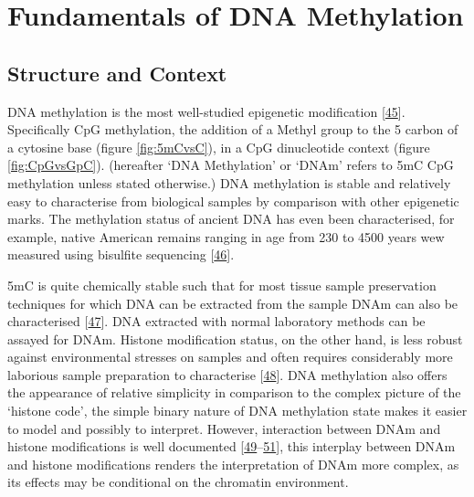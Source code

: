\documentclass[
]{book}
\begin{document}
\hypertarget{fundamentals-of-dna-methylation}{%
\section{Fundamentals of DNA Methylation}\label{fundamentals-of-dna-methylation}}

\hypertarget{structure-and-context}{%
\subsection{Structure and Context}\label{structure-and-context}}

DNA methylation is the most well-studied epigenetic modification {[}\protect\hyperlink{ref-Haluskova2010}{45}{]}.
Specifically CpG methylation, the addition of a Methyl group to the 5 carbon of a cytosine base (figure \ref{fig:5mCvsC}), in a CpG dinucleotide context (figure \ref{fig:CpGvsGpC}).
(hereafter `DNA Methylation' or `DNAm' refers to 5mC CpG methylation unless stated otherwise.)
DNA methylation is stable and relatively easy to characterise from biological samples by comparison with other epigenetic marks.
The methylation status of ancient DNA has even been characterised, for example, native American remains ranging in age from 230 to 4500 years wew measured using bisulfite sequencing {[}\protect\hyperlink{ref-Smith2015}{46}{]}.

5mC is quite chemically stable such that for most tissue sample preservation techniques for which DNA can be extracted from the sample DNAm can also be characterised {[}\protect\hyperlink{ref-Briggs2010}{47}{]}.
DNA extracted with normal laboratory methods can be assayed for DNAm.
Histone modification status, on the other hand, is less robust against environmental stresses on samples and often requires considerably more laborious sample preparation to characterise {[}\protect\hyperlink{ref-Bauden2017}{48}{]}.
DNA methylation also offers the appearance of relative simplicity in comparison to the complex picture of the `histone code', the simple binary nature of DNA methylation state makes it easier to model and possibly to interpret.
However, interaction between DNAm and histone modifications is well documented {[}\protect\hyperlink{ref-Hashimshony2003}{49}--\protect\hyperlink{ref-Rose2014}{51}{]}, this interplay between DNAm and histone modifications renders the interpretation of DNAm more complex, as its effects may be conditional on the chromatin environment.
\end{document}
